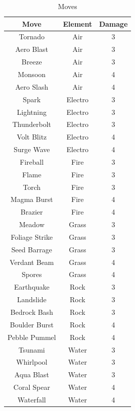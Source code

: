 \documentclass[12pt, a4paper]{report}
\begin{document}
\begin{table}[H]
    \begin{center}
    \begin{tabular}{| c | c | c |}
        \hline
        Move & Element & Damage \\
        \hline \hline
        Tornado & Air & 3 \\
        \hline
        Aero Blast & Air & 3 \\
        \hline
        Breeze & Air & 3 \\
        \hline
        Monsoon & Air & 4 \\
        \hline
        Aero Slash & Air & 4 \\
        \hline
        Spark & Electro & 3 \\
        \hline
        Lightning & Electro & 3 \\
        \hline
        Thunderbolt & Electro & 3 \\
        \hline
        Volt Blitz & Electro & 4 \\
        \hline
        Surge Wave & Electro & 4 \\
        \hline
        Fireball & Fire & 3 \\
        \hline
        Flame & Fire & 3 \\
        \hline
        Torch & Fire & 3 \\
        \hline
        Magma Burst & Fire & 4 \\
        \hline
        Brazier & Fire & 4 \\
        \hline
        Meadow & Grass & 3 \\
        \hline
        Foliage Strike & Grass & 3 \\
        \hline
        Seed Barrage & Grass & 3 \\
        \hline
        Verdant Beam & Grass & 4 \\
        \hline
        Spores & Grass & 4 \\
        \hline
        Earthquake & Rock & 3 \\
        \hline
        Landslide & Rock & 3 \\
        \hline
        Bedrock Bash & Rock & 3 \\
        \hline
        Boulder Burst & Rock & 4 \\
        \hline
        Pebble Pummel & Rock & 4 \\
        \hline
        Tsunami & Water & 3 \\
        \hline
        Whirlpool & Water & 3 \\
        \hline
        Aqua Blast & Water & 3 \\
        \hline
        Coral Spear & Water & 4 \\
        \hline
        Waterfall & Water & 4 \\
        \hline
    \end{tabular}
    \caption{\label{table:moves} Moves}
    \end{center}
\end{table}
\end{document}
